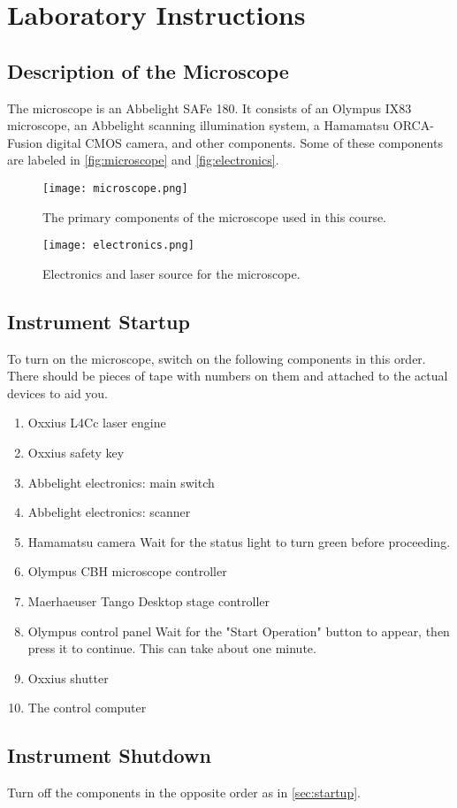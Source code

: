 \documentclass[10pt,a4paper,oneside]{book}
\begin{document}
\chapter{Laboratory Instructions}

\section{Description of the Microscope}

The microscope is an Abbelight SAFe 180. It consists of an Olympus IX83 microscope, an Abbelight scanning illumination system, a Hamamatsu ORCA-Fusion digital CMOS camera, and other components. Some of these components are labeled in \autoref{fig:microscope} and \autoref{fig:electronics}.

\begin{figure}[ht]
    \centering
    \texttt{[image: microscope.png]}
    \caption{The primary components of the microscope used in this course.}
    \label{fig:microscope}
\end{figure}

\begin{figure}[ht]
    \centering
    \texttt{[image: electronics.png]}
    \caption{Electronics and laser source for the microscope.}
    \label{fig:electronics}
\end{figure}

\section{Instrument Startup}\label{sec:startup}

To turn on the microscope, switch on the following components in this order. There should be pieces of tape with numbers on them and attached to the actual devices to aid you.

\begin{enumerate}
    \item Oxxius L4Cc laser engine
    \item Oxxius safety key
    \item Abbelight electronics: main switch
    \item Abbelight electronics: scanner
    \item Hamamatsu camera \newline Wait for the status light to turn green before proceeding.
    \item Olympus CBH microscope controller
    \item Maerhaeuser Tango Desktop stage controller
    \item Olympus control panel \newline Wait for the "Start Operation" button to appear, then press it to continue. This can take about one minute.
    \item Oxxius shutter
    \item The control computer
\end{enumerate}

\section{Instrument Shutdown}

Turn off the components in the opposite order as in \autoref{sec:startup}.
\end{document}
